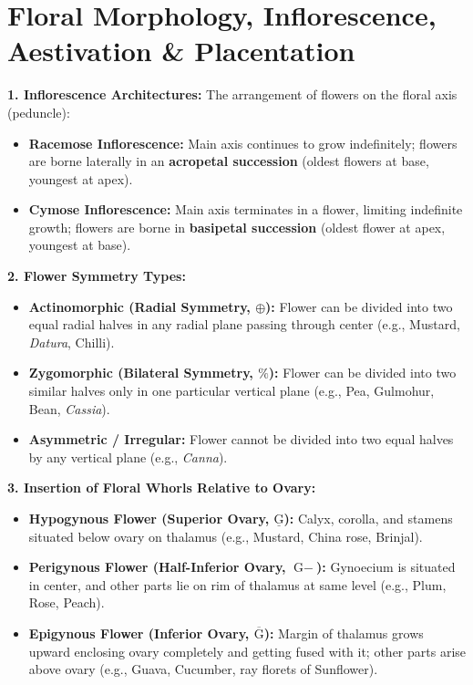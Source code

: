 \documentclass[10pt,twoside,openright]{book}
\begin{document}
\section{Floral Morphology, Inflorescence, Aestivation \& Placentation}

\begin{conceptbox}
\textbf{1. Inflorescence Architectures:}
The arrangement of flowers on the floral axis (peduncle):
\begin{itemize}
  \item \textbf{Racemose Inflorescence:} Main axis continues to grow indefinitely; flowers are borne laterally in an \textbf{acropetal succession} (oldest flowers at base, youngest at apex).
  \item \textbf{Cymose Inflorescence:} Main axis terminates in a flower, limiting indefinite growth; flowers are borne in \textbf{basipetal succession} (oldest flower at apex, youngest at base).
\end{itemize}

\textbf{2. Flower Symmetry Types:}
\begin{itemize}
  \item \textbf{Actinomorphic (Radial Symmetry, $\oplus$):} Flower can be divided into two equal radial halves in any radial plane passing through center (e.g., Mustard, \textit{Datura}, Chilli).
  \item \textbf{Zygomorphic (Bilateral Symmetry, $\%$):} Flower can be divided into two similar halves only in one particular vertical plane (e.g., Pea, Gulmohur, Bean, \textit{Cassia}).
  \item \textbf{Asymmetric / Irregular:} Flower cannot be divided into two equal halves by any vertical plane (e.g., \textit{Canna}).
\end{itemize}

\textbf{3. Insertion of Floral Whorls Relative to Ovary:}
\begin{itemize}
  \item \textbf{Hypogynous Flower (Superior Ovary, $\underline{\text{G}}$):} Calyx, corolla, and stamens situated below ovary on thalamus (e.g., Mustard, China rose, Brinjal).
  \item \textbf{Perigynous Flower (Half-Inferior Ovary, $\text{G}-$):} Gynoecium is situated in center, and other parts lie on rim of thalamus at same level (e.g., Plum, Rose, Peach).
  \item \textbf{Epigynous Flower (Inferior Ovary, $\overline{\text{G}}$):} Margin of thalamus grows upward enclosing ovary completely and getting fused with it; other parts arise above ovary (e.g., Guava, Cucumber, ray florets of Sunflower).
\end{itemize}
\end{conceptbox}
\end{document}
